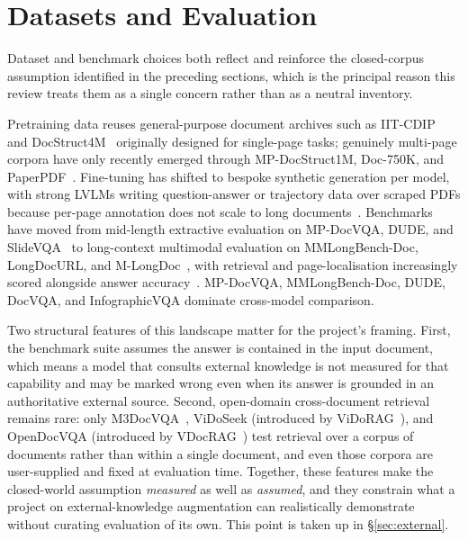 \documentclass[11pt]{article}
\begin{document}
\section{Datasets and Evaluation}
\label{sec:datasets}

Dataset and benchmark choices both reflect and reinforce the closed-corpus assumption identified in the preceding sections, which is the principal reason this review treats them as a single concern rather than as a neutral inventory.

Pretraining data reuses general-purpose document archives such as IIT-CDIP~\cite{lewis2006iitcdip} and DocStruct4M~\cite{hu2024mplug1.5} originally designed for single-page tasks; genuinely multi-page corpora have only recently emerged through MP-DocStruct1M, Doc-750K, and PaperPDF~\cite{hu2025mplug2,duan2025docopilot,xie2024wukong}. Fine-tuning has shifted to bespoke synthetic generation per model, with strong LVLMs writing question-answer or trajectory data over scraped PDFs because per-page annotation does not scale to long documents~\cite{tanaka2024instructdoc,jain2025simpledoc,xiong2026docr1,zhang2026docdancer}. Benchmarks have moved from mid-length extractive evaluation on MP-DocVQA, DUDE, and SlideVQA~\cite{tito2023hierarchical,van2023document,tanaka2023slidevqa} to long-context multimodal evaluation on MMLongBench-Doc, LongDocURL, and M-LongDoc~\cite{ma2024mmlongbench,deng2025longdocurl,chia2025m}, with retrieval and page-localisation increasingly scored alongside answer accuracy~\cite{hui2024uda,xiong2026docr1,zhu2025doclens}. MP-DocVQA, MMLongBench-Doc, DUDE, DocVQA, and InfographicVQA dominate cross-model comparison.

Two structural features of this landscape matter for the project's framing. First, the benchmark suite assumes the answer is contained in the input document, which means a model that consults external knowledge is not measured for that capability and may be marked wrong even when its answer is grounded in an authoritative external source. Second, open-domain cross-document retrieval remains rare: only M3DocVQA~\cite{cho2025m3docvqa}, ViDoSeek (introduced by ViDoRAG~\cite{wang2025vidorag}), and OpenDocVQA (introduced by VDocRAG~\cite{tanaka2025vdocrag}) test retrieval over a corpus of documents rather than within a single document, and even those corpora are user-supplied and fixed at evaluation time. Together, these features make the closed-world assumption \emph{measured} as well as \emph{assumed}, and they constrain what a project on external-knowledge augmentation can realistically demonstrate without curating evaluation of its own. This point is taken up in \S\ref{sec:external}.
\end{document}

